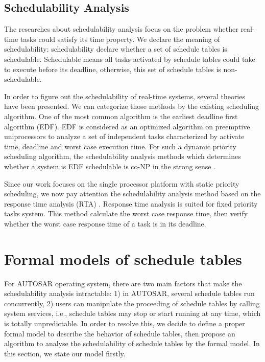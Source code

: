 \documentclass[conference]{IEEEtran}
\begin{document}
\subsection{Schedulability Analysis}
The researches about schedulability analysis focus on the problem whether real-time tasks could satisfy its time property. We declare the meaning of schedulability: schedulability declare whether a set of schedule tables is schedulable. Schedulable means all tasks activated by schedule tables could take to execute before its deadline, otherwise, this set of schedule tables is non-schedulable.

In order to figure out the schedulability of real-time systems, several theories have been presented. We can categorize those methods by the existing scheduling algorithm. One of the most common algorithm is the earliest deadline first algorithm (EDF). EDF is considered as an optimized algorithm on preemptive uniprocessors to analyze a set of independent tasks characterized by activate time, deadline and worst case execution time. For such a dynamic priority scheduling algorithm, the schedulability analysis methods which determines whether a system is EDF schedulable is co-NP in the strong sense \cite{Goossens:1999:LWC:553897}.

Since our work focuses on the single processor platform with static priority scheduling, we now pay attention the schedulability analysis method based on the response time analysis (RTA) \cite{DBLP:journals/iee/AudsleyBRTW93}. Response time analysis is suited for fixed priority tasks system. This method calculate the worst case response time, then verify whether the worst case response time of a task is in its deadline. 

\section{Formal models of schedule tables} 
For AUTOSAR operating system, there are two main factors that make the schedulability analysis intractable: 1) in AUTOSAR, several schedule tables run concurrently, 2) users can manipulate the proceeding of schedule tables by calling system services, i.e., schedule tables may stop or start running at any time, which is totally unpredictable. In order to resolve this, we decide to define a proper formal model to describe the behavior of schedule tables, then propose an algorithm to analyse the schedulability of schedule tables by the formal model. In this section, we state our model firstly. 
\end{document}
